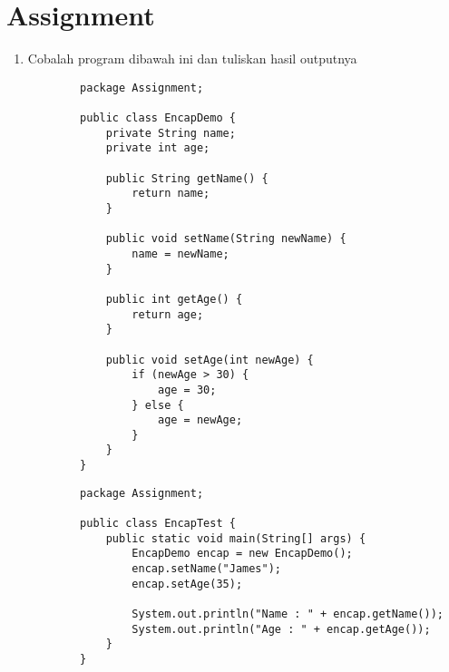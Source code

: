 \documentclass[12pt,titlepage]{article}
\begin{document}
\newpage

\setcounter{section}{4}
\section{Assignment}
\begin{enumerate}
    \item Cobalah program dibawah ini dan tuliskan hasil outputnya
    \begin{verbatim}
        package Assignment;

        public class EncapDemo {
            private String name;
            private int age;

            public String getName() {
                return name;
            }

            public void setName(String newName) {
                name = newName;
            }

            public int getAge() {
                return age;
            }

            public void setAge(int newAge) {
                if (newAge > 30) {
                    age = 30;
                } else {
                    age = newAge;
                }
            }
        }

    \end{verbatim}
    \begin{verbatim}
        package Assignment;

        public class EncapTest {
            public static void main(String[] args) {
                EncapDemo encap = new EncapDemo();
                encap.setName("James");
                encap.setAge(35);

                System.out.println("Name : " + encap.getName());
                System.out.println("Age : " + encap.getAge());
            }
        }


\end{verbatim}
\end{enumerate}
\end{document}
